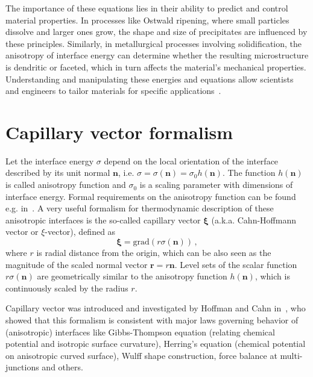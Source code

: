 The importance of these equations lies in their ability to predict and control material properties. In processes like Ostwald ripening, where small particles dissolve and larger ones grow, the shape and size of precipitates are influenced by these principles. Similarly, in metallurgical processes involving solidification, the anisotropy of interface energy can determine whether the resulting microstructure is dendritic or faceted, which in turn affects the material’s mechanical properties. Understanding and manipulating these energies and equations allow scientists and engineers to tailor materials for specific applications~\cite{Steinbach2023}.

\section{Capillary vector formalism}
Let the interface energy $\sigma$ depend on the local orientation of the interface described by its unit normal $\bm{n}$, i.e. $\sigma=\sigma(\bm{n})=\sigma_0 h(\bm{n})$. The function $h(\bm{n})$ is called anisotropy function and $\sigma_0$  is a scaling parameter with dimensions of interface energy. Formal requirements on the anisotropy function can be found e.g. in~\cite{Kobayashi2001}. A very useful formalism for thermodynamic description of these anisotropic interfaces is the so-called capillary vector $\bm{\xi}$ (a.k.a. Cahn-Hoffmann vector or $\xi$-vector), defined as~\cite{Hoffman1972,Cahn1974}
\begin{equation}
    \bm{\xi} = \mathrm{grad}(r\sigma(\bm{n}))\,,
\end{equation}
where $r$ is radial distance from the origin, which can be also seen as the magnitude of the scaled normal vector $\bm{r}=r\bm{n}$. Level sets of the scalar function $r\sigma(\bm{n})$ are geometrically similar to the anisotropy function $h(\bm{n})$, which is continuously scaled by the radius $r$.

Capillary vector was introduced and investigated by Hoffman and Cahn in~\cite{Hoffman1972,Cahn1974}, who showed that this formalism is consistent with major laws governing behavior of (anisotropic) interfaces like Gibbs-Thompson equation (relating chemical potential and isotropic surface curvature), Herring's equation (chemical potential on anisotropic curved surface), Wulff shape construction, force balance at multi-junctions and others. 

